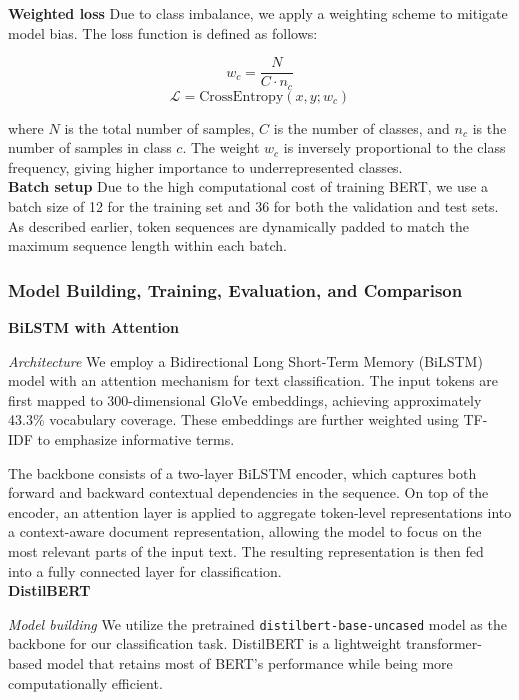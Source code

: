 \noindent \textbf{Weighted loss} Due to class imbalance, we apply a weighting scheme to mitigate model bias. The loss function is defined as follows:

\begin{equation}
w_c = \frac{N}{C \cdot n_c}
\end{equation}
\begin{equation}
\mathcal{L} = \text{CrossEntropy}(x, y; w_c)
\end{equation}

\noindent where $N$ is the total number of samples, $C$ is the number of classes, and $n_c$ is the number of samples in class $c$. The weight $w_c$ is inversely proportional to the class frequency, giving higher importance to underrepresented classes. \\

\noindent \textbf{Batch setup} Due to the high computational cost of training BERT, we use a batch size of 12 for the training set and 36 for both the validation and test sets. As described earlier, token sequences are dynamically padded to match the maximum sequence length within each batch. \\ 

\subsubsection{Model Building, Training, Evaluation, and Comparison}
\noindent \textbf{BiLSTM with Attention} 

\noindent \textit{Architecture} We employ a Bidirectional Long Short-Term Memory (BiLSTM) model with an attention mechanism for text classification. The input tokens are first mapped to 300-dimensional GloVe embeddings, achieving approximately 43.3\% vocabulary coverage. These embeddings are further weighted using TF-IDF to emphasize informative terms.

\noindent The backbone consists of a two-layer BiLSTM encoder, which captures both forward and backward contextual dependencies in the sequence. On top of the encoder, an attention layer is applied to aggregate token-level representations into a context-aware document representation, allowing the model to focus on the most relevant parts of the input text. The resulting representation is then fed into a fully connected layer for classification. \\ 


\noindent \textbf{DistilBERT}

\noindent \textit{Model building} We utilize the pretrained \texttt{distilbert-base-uncased} model as the backbone for our classification task. DistilBERT is a lightweight transformer-based model that retains most of BERT's performance while being more computationally efficient.

